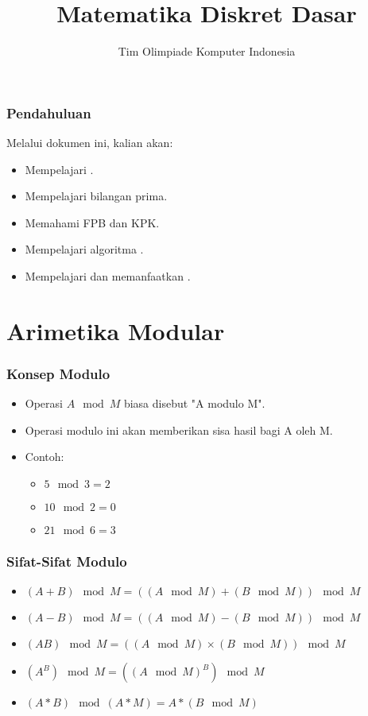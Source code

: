 

\title{Matematika Diskret Dasar}
\author{Tim Olimpiade Komputer Indonesia}
\date{}



\begin{frame}
\titlepage
\end{frame}

\begin{frame}
\frametitle{Pendahuluan}
Melalui dokumen ini, kalian akan:
\begin{itemize}
  \item Mempelajari .
  \item Mempelajari bilangan prima.
  \item Memahami FPB dan KPK.
  \item Mempelajari algoritma .
  \item Mempelajari dan memanfaatkan .
\end{itemize}
\end{frame}

\section{Arimetika Modular}
\frame{\sectionpage}

\begin{frame}
\frametitle{Konsep Modulo}
\begin{itemize}
  \item Operasi $A \mod M$ biasa disebut "A modulo M".
  \item Operasi modulo ini akan memberikan sisa hasil bagi A oleh M.
  \item Contoh: 
  \begin{itemize}
    \item $5 \mod 3 = 2$ 
    \item $10 \mod 2 = 0$
    \item $21 \mod 6 = 3$
  \end{itemize}  
\end{itemize}
\end{frame}

\begin{frame}
\frametitle{Sifat-Sifat Modulo}
\begin{itemize}
  \item $(A + B) \mod M = ((A \mod M) + (B \mod M)) \mod M$
  \item $(A - B) \mod M = ((A \mod M) - (B \mod M)) \mod M$
  \item $(AB) \mod M = ((A \mod M) \times (B \mod M)) \mod M$  
  \item $(A^{B}) \mod M = ((A \mod M)^{B}) \mod M$
  \item $(A * B) \mod (A * M) = A * (B \mod M)$
\end{itemize}
\end{frame} 


